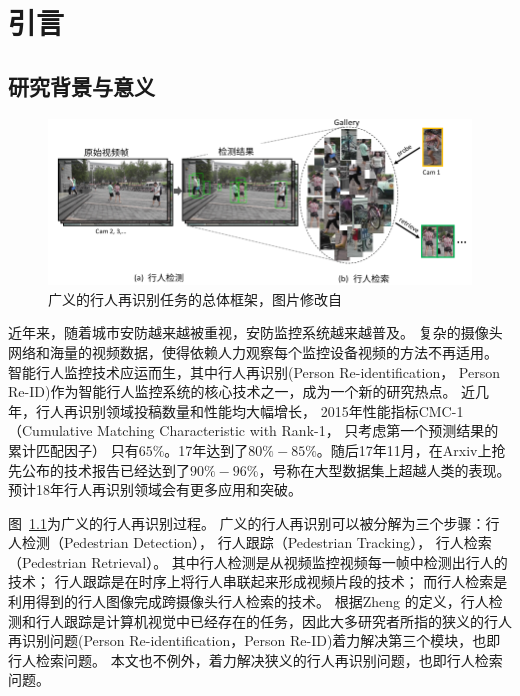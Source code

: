﻿%


\chapter{引言}

\section{研究背景与意义}

\begin{figure}
	\includegraphics[width=\textwidth]{fig/background.png}
	\caption{广义的行人再识别任务的总体框架，图片修改自~\cite{zheng2017person}}
	\label{fig:overall}
\end{figure}

近年来，随着城市安防越来越被重视，安防监控系统越来越普及。
复杂的摄像头网络和海量的视频数据，使得依赖人力观察每个监控设备视频的方法不再适用。
智能行人监控技术应运而生，其中行人再识别(Person Re-identification， Person Re-ID)作为智能行人监控系统的核心技术之一，成为一个新的研究热点。
近几年，行人再识别领域投稿数量和性能均大幅增长，
2015年性能指标CMC-1（Cumulative Matching Characteristic with Rank-1， 只考虑第一个预测结果的累计匹配因子）
只有$65\%$。17年达到了$80\%-85\%$。随后17年11月，在Arxiv上抢先公布的技术报告已经达到了$90\%-96\%$，号称在大型数据集上超越人类的表现。预计18年行人再识别领域会有更多应用和突破。

图~\ref{fig:overall}为广义的行人再识别过程。
广义的行人再识别可以被分解为三个步骤：行人检测（Pedestrian Detection），
行人跟踪（Pedestrian Tracking），
行人检索（Pedestrian Retrieval）。
其中行人检测是从视频监控视频每一帧中检测出行人的技术；
行人跟踪是在时序上将行人串联起来形成视频片段的技术；
而行人检索是利用得到的行人图像完成跨摄像头行人检索的技术。
根据Zheng \etal \parencite{zheng2017person} 的定义，行人检测和行人跟踪是计算机视觉中已经存在的任务，因此大多研究者所指的狭义的行人再识别问题(Person Re-identification，Person Re-ID)着力解决第三个模块，也即
行人检索问题。
本文也不例外，着力解决狭义的行人再识别问题，也即行人检索问题。

